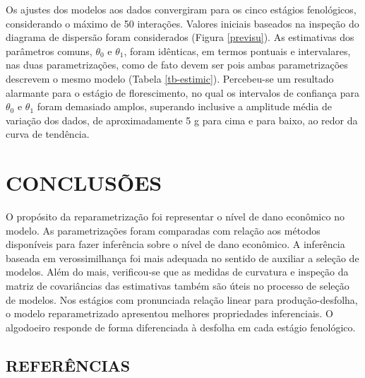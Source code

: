 Os ajustes dos modelos aos dados convergiram para os cinco estágios
fenológicos, considerando o máximo de 50 interações.  Valores iniciais
baseados na inspeção do diagrama de dispersão foram considerados
(Figura \ref{previsu}).  As estimativas dos parâmetros comuns,
$\theta_0$ e $\theta_1$, foram idênticas, em termos pontuais e
intervalares, nas duas parametrizações, como de fato devem ser pois
ambas parametrizações descrevem o mesmo modelo (Tabela
\ref{tb-estimic}). Percebeu-se um resultado alarmante para o estágio
de florescimento, no qual os intervalos de confiança para $\theta_0$ e
$\theta_1$ foram demasiado amplos, superando inclusive a amplitude
média de variação dos dados, de aproximadamente 5 g para cima e para
baixo, ao redor da curva de tendência.

\newpage
\section{CONCLUSÕES}

O propósito da reparametrização foi representar o nível de dano
econômico no modelo. As parametrizações foram comparadas com relação
aos métodos disponíveis para fazer inferência sobre o nível de dano
econômico. A inferência baseada em verossimilhança foi mais adequada
no sentido de auxiliar a seleção de modelos. Além do mais,
verificou-se que as medidas de curvatura e inspeção da matriz de
covariâncias das estimativas também são úteis no processo de seleção
de modelos. Nos estágios com pronunciada relação linear para
produção-desfolha, o modelo reparametrizado apresentou melhores
propriedades inferenciais.  O algodoeiro responde de forma
diferenciada à desfolha em cada estágio fenológico.

\newpage
{}
\begin{center}
\section*{REFERÊNCIAS} 
\end{center}
